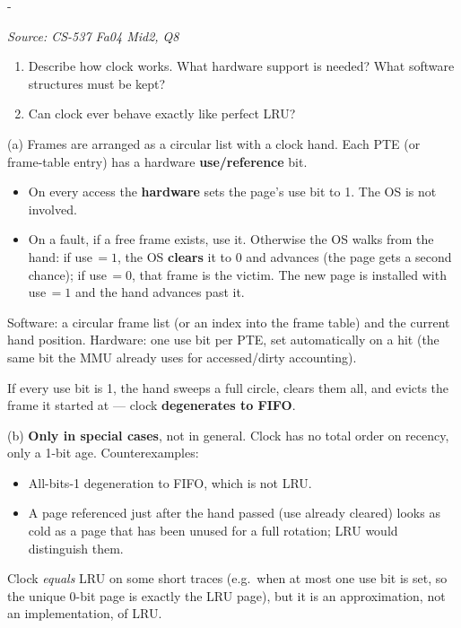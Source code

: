 \documentclass[11pt,a4paper]{article}
\makeatletter
\newcommand{\keepspace}[1]{\par\penalty-100\begingroup
  \setlength{\dimen@}{#1}\dimen@ii\pagegoal\advance\dimen@ii-\pagetotal
  \ifdim\dimen@>\dimen@ii\ifdim\dimen@ii>\z@\vfil\fi\break\fi\endgroup}
\newcounter{qn}[section]
\newenvironment{Qn}[4]{%
  \refstepcounter{qn}\keepspace{7\baselineskip}%
  \begin{tcolorbox}[qboxstyle, title={Q\thesection.\theqn\ \ [#1 \textbar\ #2]\ \ #4}]%
  {\footnotesize\color{g3}\textit{Source: #3}}\par\smallskip%
}{%
  \end{tcolorbox}%
}
\newenvironment{Sol}{%
  \begin{tcolorbox}[sboxstyle, title={Solution}]%
}{%
  \end{tcolorbox}\vspace{0.35em}%
}
\makeatother
\begin{document}
\begin{Qn}{Medium-Hard}{Lect 15}{CS-537 Fa04 Mid2, Q8}{Clock / second-chance: mechanism, hardware, and relation to LRU}
\begin{enumerate}
  \item[(a)] Describe how clock works. What hardware support is needed?
        What software structures must be kept?
  \item[(b)] Can clock ever behave exactly like perfect LRU?
\end{enumerate}
\end{Qn}
\begin{Sol}
(a) Frames are arranged as a circular list with a clock hand. Each PTE
(or frame-table entry) has a hardware \textbf{use/reference} bit.
\begin{itemize}
  \item On every access the \textbf{hardware} sets the page's use bit
        to 1. The OS is not involved.
  \item On a fault, if a free frame exists, use it. Otherwise the OS
        walks from the hand: if use$\,=1$, the OS \textbf{clears} it to
        0 and advances (the page gets a second chance); if use$\,=0$,
        that frame is the victim. The new page is installed with
        use$\,=1$ and the hand advances past it.
\end{itemize}
Software: a circular frame list (or an index into the frame table) and
the current hand position. Hardware: one use bit per PTE, set
automatically on a hit (the same bit the MMU already uses for
accessed/dirty accounting).

If every use bit is 1, the hand sweeps a full circle, clears them all,
and evicts the frame it started at --- clock \textbf{degenerates to
FIFO}.

(b) \textbf{Only in special cases}, not in general. Clock has no total
order on recency, only a 1-bit age. Counterexamples:
\begin{itemize}
  \item All-bits-1 degeneration to FIFO, which is not LRU.
  \item A page referenced just after the hand passed (use already
        cleared) looks as cold as a page that has been unused for a
        full rotation; LRU would distinguish them.
\end{itemize}
Clock \emph{equals} LRU on some short traces (e.g.\ when at most one
use bit is set, so the unique 0-bit page is exactly the LRU page), but
it is an approximation, not an implementation, of LRU.
\end{Sol}
\end{document}
